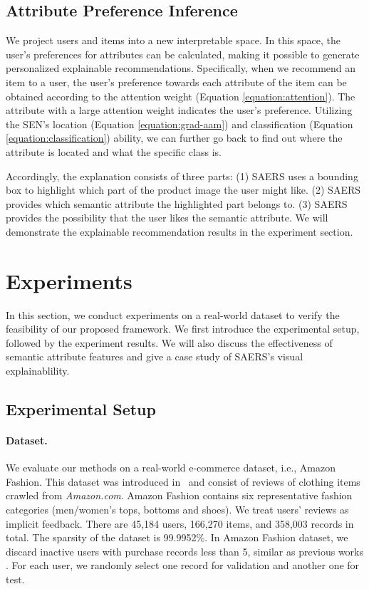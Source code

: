\documentclass{article}
\begin{document}
\subsection{Attribute Preference Inference} \label{ssec:explanation}
We project users and items into a new interpretable space. In this space, the user's preferences for attributes can be calculated, making it possible to generate personalized explainable recommendations. Specifically, when we recommend an item to a user, the user’s preference towards each attribute of the item can be obtained according to the attention weight (Equation \ref{equation:attention}). The attribute with a large attention weight indicates the user's preference. Utilizing the SEN’s location (Equation \ref{equation:grad-aam}) and classification (Equation \ref{equation:classification}) ability, we can further go back to find out where the attribute is located and what the specific class is. 

Accordingly, the explanation consists of three parts: 
(1) SAERS uses a bounding box to highlight which part of the product image the user might like. 
(2) SAERS provides which semantic attribute the highlighted part belongs to. 
(3) SAERS provides the possibility that the user likes the semantic attribute. We will demonstrate the explainable recommendation results in the experiment section.



\section{Experiments}
In this section, we conduct experiments on a real-world dataset to verify the feasibility of our proposed framework. We first introduce the experimental setup, followed by the experiment results. We will also discuss the effectiveness of semantic attribute features and give a case study of SAERS's visual explainablility.


\subsection{Experimental Setup}

\paragraph{Dataset.} We evaluate our methods on a real-world e-commerce dataset, i.e., Amazon Fashion. This dataset was introduced in~\cite{he2016vbpr,kang2017visually} and consist of reviews of clothing items crawled from \textit{Amazon.com}. Amazon Fashion contains six representative fashion categories (men/women's tops, bottoms and shoes). We treat users' reviews as implicit feedback. There are 45,184 users, 166,270 items, and 358,003 records in total. The sparsity of the dataset is 99.9952\%. In Amazon Fashion dataset, we discard inactive users with purchase records less than 5, similar as previous works \cite{he2016vbpr,kang2017visually}. For each user, we randomly select one record for validation and another one for test. 
\end{document}
